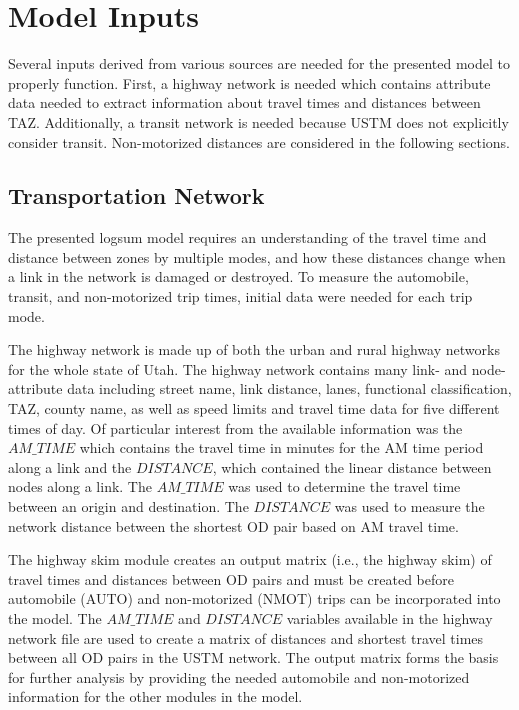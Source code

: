 \section{Model Inputs}

Several inputs derived from various sources are needed for the presented model
to properly function. First, a highway network is needed which contains attribute
data needed to extract information about travel times and distances between
TAZ. Additionally, a transit network is needed
because USTM does not explicitly consider transit. Non-motorized distances are
considered in the following sections.

\subsection{Transportation Network}

The presented logsum model requires an
understanding of the travel time and distance between zones by multiple modes, and how
these distances change when a link in the network is damaged or destroyed. To measure the
automobile, transit, and non-motorized trip times, initial data were needed for each trip mode.

The highway network is made up of both the urban and rural highway networks
for the whole state of Utah. The highway network contains many link- and
node-attribute data including street name, link distance, lanes, functional
classification, TAZ, county name,
as well as speed limits and travel time data for five different times of day.
Of particular interest from the available information was the \(AM\_TIME\) which
contains the travel time in minutes for the AM time period along a link and
the \(DISTANCE\), which contained the linear distance between nodes along a link.
The \(AM\_TIME\) was used to determine the travel time between an origin and
destination. The \(DISTANCE\) was used to measure the network distance between
the shortest OD pair based on AM travel time.

The highway skim module creates an output matrix (i.e., the highway skim) of travel
times and distances between OD pairs and must be created
before automobile (AUTO) and non-motorized (NMOT) trips can be incorporated
into the model. The \(AM\_TIME\) and \(DISTANCE\) variables available in
the highway network file are used to create a matrix of distances and shortest travel
times between all OD pairs in the USTM network. The output matrix forms the
basis for further analysis by providing the needed automobile and non-motorized
information for the other modules in the model.

